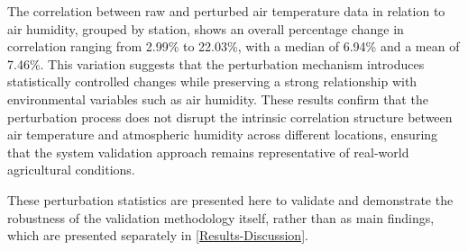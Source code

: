 \documentclass[authoryear,preprint,review,12pt]{elsarticle}
\newcommand{\statusblock}[3]{
    \ifthenelse{\equal{#2}{todo}}
        {\textcolor{red}{#1 (TO DO): #3}}
        {}
    \ifthenelse{\equal{#2}{wip}}
        {\textcolor{magenta}{#1 (IN PROGRESS): #3}}
        {}
    \ifthenelse{\equal{#2}{update}}
        {\textcolor{blue}{#1 (UPDATE): #3}}
        {}
    \ifthenelse{\equal{#2}{review}}
        {\textcolor{cyan}{#1 (REVIEW): #3}}
        {}
    \ifthenelse{\equal{#2}{done}}
        {\textcolor{PineGreen}{#1 (READY): #3}}
        {}
}
\begin{document}
The correlation between raw and perturbed air temperature data in relation to air humidity, grouped by station,  shows an overall percentage change in correlation ranging from 2.99\% to 22.03\%, with a median of 6.94\% and a mean of 7.46\%.  
This variation suggests that the perturbation mechanism introduces statistically controlled changes while preserving a strong relationship with environmental variables such as air humidity.  
These results confirm that the perturbation process does not disrupt the intrinsic correlation structure between air temperature and atmospheric humidity across different locations, ensuring that the system validation approach remains representative of real-world agricultural conditions.

These perturbation statistics are presented here to validate and demonstrate the robustness of the validation methodology itself, rather than as main findings, which are presented separately in \cref{Results-Discussion}.


\end{document}
